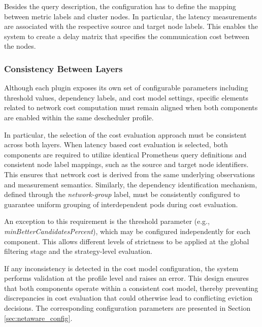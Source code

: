 Besides the query description, the configuration has to define the mapping between metric labels and cluster nodes. In particular, the latency measurements are associated with the respective source and target node labels. This enables the system to create a delay matrix that specifies the communication cost between the nodes.

\subsubsection{Consistency Between Layers}
\label{sec:netaware_costmodelconsistency}
Although each plugin exposes its own set of configurable parameters including threshold values, dependency labels, and cost model settings, specific elements related to network cost computation must remain aligned when both components are enabled within the same descheduler profile. 

In particular, the selection of the cost evaluation approach must be consistent across both layers. When latency based cost evaluation is selected, both components are required to utilize identical Prometheus query definitions and consistent node label mappings, such as the source and target node identifiers. This ensures that network cost is derived from the same underlying observations and measurement semantics. Similarly, the dependency identification mechanism, defined through the \textit{network-group} label, must be consistently configured to guarantee uniform grouping of interdependent pods during cost evaluation.

An exception to this requirement is the threshold parameter (e.g., \textit{minBetterCandidatesPercent}), which may be configured independently for each component. This allows different levels of strictness to be applied at the global filtering stage and the strategy-level evaluation.

If any inconsistency is detected in the cost model configuration, the system performs validation at the profile level and raises an error. This design ensures that both components operate within a consistent cost model, thereby preventing discrepancies in cost evaluation that could otherwise lead to conflicting eviction decisions. The corresponding configuration parameters are presented in Section \ref{sec:netaware_config}.




